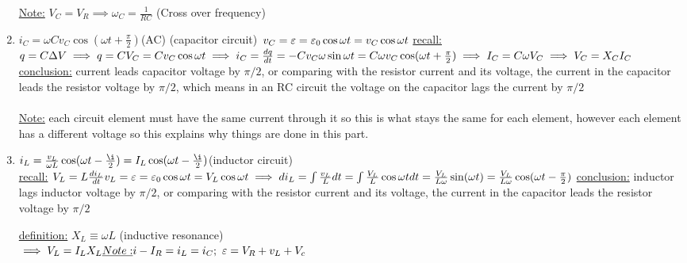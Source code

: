 \documentclass[12pt]{amsart}
\begin{document}
\begin{enumerate}
\underline{Note:} $V_C = V_R \implies \omega_C = \frac{1}{RC}$ (Cross over frequency)

\item \underline{$i_C = \omega C v_C \cos (\omega t + \frac{\pi}{2})$}(AC) (capacitor circuit)\
$v_C = \varepsilon = \varepsilon_0 \cos \omega t = v_C \cos \omega t\\$
\underline{recall:} $q =C \Delta V\\
\implies q = C V_C = C v_C \cos \omega t \\
\implies i_C = \frac{dq}{dt} = - C v_C \omega \sin \omega t = C \omega v_C \cos (\omega t + \frac{\pi}{2})\\
\implies I_C = C \omega V_C \implies V_C = X_C I_C\\$
\underline{conclusion:} current leads capacitor voltage by $\pi/2$, or comparing with the resistor current and its voltage, the current in the capacitor leads the resistor voltage by  $\pi/2$, which means in an RC circuit the voltage on the capacitor lags the current by $\pi/2$\\
\\
\underline{Note:} each circuit element must have the same current through it so this is what stays the same for each element, however each element has a different voltage so this explains why things are done in this part.

\hdashrule[0.5ex][c]{\linewidth}{0.5pt}{1.5mm}


\item \underline{$i_L = \frac{v_L}{\omega L} \cos(\omega t - \frac{\i}{2} ) = I_L \cos (\omega t - \frac{\i}{2})$}(inductor circuit)\\
\underline{recall:} $V_L = L \frac{d i_L}{dt}\\
v_L = \varepsilon = \varepsilon_0 \cos \omega t = V_L \cos \omega t\\
\implies d i_L = \int \frac{v_L}{L} dt = \int \frac{V_L}{L} \cos \omega t dt = \frac{V_L}{L \omega } \sin ( \omega t)\\
= \frac{V_L}{L \omega} \cos (\omega t - \frac{\pi}{2})\\$
\underline{conclusion:} inductor lags inductor voltage by $\pi/2$, or comparing with the resistor current and its voltage, the current in the capacitor leads the resistor voltage by  $\pi/2$


\hdashrule[0.5ex][c]{\linewidth}{0.5pt}{1.5mm}


\underline{definition:} $X_L \equiv \omega L$ (inductive resonance)\\
$\implies V_L = I_L X_L\\
\underline{Note:} i- I_R = i_L = i_C;\,\, \varepsilon = V_R + v_L+ V_c\\$




\end{enumerate}
\end{document}
